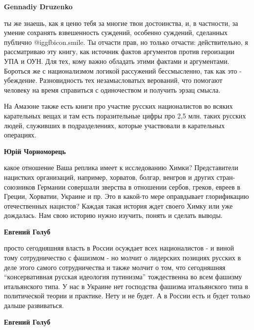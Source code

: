 \begin{itemize}
\begin{itemize}
\textbf{Gennadiy Druzenko} 

ты же знаешь, как я ценю тебя за многие твои достоинства, и, в частности, за
умение сохранять взвешенность суждений, особенно суждений, сделанных публично
 @igg{fbicon.smile}. Ты отчасти прав, но только отчасти: действительно, я рассматриваю эту
книгу, как источник фактов аргументов против героизации УПА и ОУН. Для тех,
кому важно обладать этими фактами и аргументами. Бороться же с национализмом
логикой рассужений бессмысленно, так как это - убеждение. Разновидность тех
незамысловатых верований, что помогают человеку на время справиться с
одиночеством и получить эрзац смысла.

\end{itemize} %


На Амазоне также есть книги про участие русских националистов во всяких
карательных вещах и там есть поразительные цифры про 2,5 млн. таких русских
людей, служивших в подразделениях, которые участвовали в карательных операциях.

\begin{itemize} %
\textbf{Юрій Чорноморець} 

какое отношение Ваша реплика имеет к исследованию Химки? Представители
нацистких организаций, например, хорватов, болгар, венгров и других
стран-союзников Германии совершали зверства в отношении сербов, греков, евреев
в Греции, Хорватии, Украине и пр. Это в какой-то мере оправдывает глорификацию
отечественных нацистов? Каждая такая история ждет своего Химку или уже
дождалась. Нам свою историю нужно изучить, понять и сделать выводы.

\textbf{Евгений Голуб} 

просто сегодняшняя власть в России осуждает всех националистов - и виной тому
сотрудничество с фашизмом - но молчит о лидерских позициях русских в деле этого
самого сотрудничества и также молчит о том, что сегодняшняя \enquote{консервативная
русская идеология путинизма} тождественна во всем фашизму итальянского типа. У
нас в Украине нет господства фашизма итальянского типа в политической теории и
практике. Нету и не будет. А в России есть и будет только дальше развиваться.

\textbf{Евгений Голуб} 


\end{itemize}
\end{itemize}

